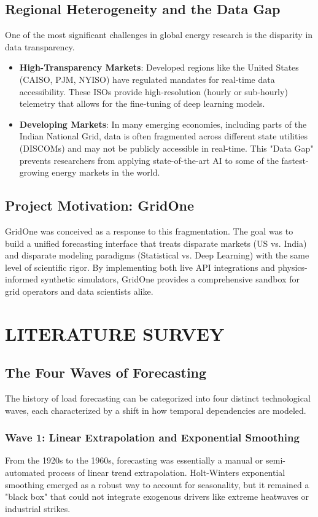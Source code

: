 \documentclass[12pt,a4paper,twoside,fleqn]{report}
\begin{document}
\section{Regional Heterogeneity and the Data Gap}
One of the most significant challenges in global energy research is the disparity in data transparency.
\begin{itemize}
    \item \textbf{High-Transparency Markets}: Developed regions like the United States (CAISO, PJM, NYISO) have regulated mandates for real-time data accessibility. These ISOs provide high-resolution (hourly or sub-hourly) telemetry that allows for the fine-tuning of deep learning models.
    \item \textbf{Developing Markets}: In many emerging economies, including parts of the Indian National Grid, data is often fragmented across different state utilities (DISCOMs) and may not be publicly accessible in real-time. This "Data Gap" prevents researchers from applying state-of-the-art AI to some of the fastest-growing energy markets in the world.
\end{itemize}

\section{Project Motivation: GridOne}
GridOne was conceived as a response to this fragmentation. The goal was to build a unified forecasting interface that treats disparate markets (US vs. India) and disparate modeling paradigms (Statistical vs. Deep Learning) with the same level of scientific rigor. By implementing both live API integrations and physics-informed synthetic simulators, GridOne provides a comprehensive sandbox for grid operators and data scientists alike.

\chapter{LITERATURE SURVEY}
\section{The Four Waves of Forecasting }
The history of load forecasting can be categorized into four distinct technological waves, each characterized by a shift in how temporal dependencies are modeled.

\subsection{Wave 1: Linear Extrapolation and Exponential Smoothing}
From the 1920s to the 1960s, forecasting was essentially a manual or semi-automated process of linear trend extrapolation. Holt-Winters exponential smoothing emerged as a robust way to account for seasonality, but it remained a "black box" that could not integrate exogenous drivers like extreme heatwaves or industrial strikes.
\end{document}
